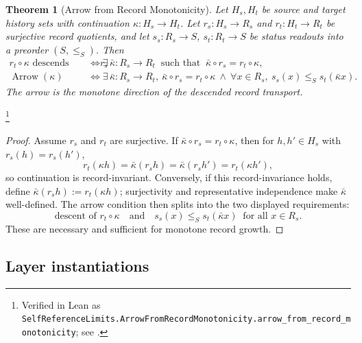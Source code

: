 \documentclass[11pt]{article}
\newtheorem{theorem}{Theorem}[section]
\theoremstyle{definition}
\begin{document}
\begin{theorem}[Arrow from Record Monotonicity]\label{thm:F38}
Let \(H_s,H_t\) be source and target history sets with continuation
\(\kappa:H_s\to H_t\). Let \(r_s:H_s\to R_s\) and
\(r_t:H_t\to R_t\) be surjective record quotients, and let
\(s_s:R_s\to S\), \(s_t:R_t\to S\) be status readouts into a preorder
\((S,\le_S)\). Then
\begin{align*}
  r_t\circ\kappa \text{ descends through } r_s
  &\iff
  \exists\,\bar\kappa:R_s\to R_t\ \text{ such that }\
    \bar\kappa\circ r_s=r_t\circ\kappa,\\
  \operatorname{Arrow}(\kappa)
  &\iff
  \exists\,\bar\kappa:R_s\to R_t,\
  \bar\kappa\circ r_s=r_t\circ\kappa
  \ \wedge\
  \forall x\in R_s,\ s_s(x)\le_S s_t(\bar\kappa x).
\end{align*}
The arrow is the monotone direction of the descended record transport.
\end{theorem}
\footnote{\raggedright Verified in Lean as
\texttt{SelfReferenceLimits.\allowbreak{}ArrowFromRecordMonotonicity.\allowbreak{}arrow\_from\_record\_monotonicity};
see .}
\begin{proof}
Assume \(r_s\) and \(r_t\) are surjective. If
\(\bar\kappa\circ r_s=r_t\circ\kappa\), then for
\(h,h'\in H_s\) with \(r_s(h)=r_s(h')\),
\[
  r_t(\kappa h)=\bar\kappa(r_s h)
              =\bar\kappa(r_s h')
              =r_t(\kappa h'),
\]
so continuation is record-invariant. Conversely, if this
record-invariance holds, define \(\bar\kappa(r_s h):=r_t(\kappa h)\);
surjectivity and representative independence make \(\bar\kappa\)
well-defined. The arrow condition then splits into the two displayed
requirements:
\[
  \text{descent of }r_t\circ\kappa\quad\text{and}\quad
  s_s(x)\le_S s_t(\bar\kappa x)\ \text{ for all }x\in R_s .
\]
These are necessary and sufficient for monotone record growth.
\end{proof}

\subsection*{Layer instantiations}\label{layer-inst:F38}
\end{document}
